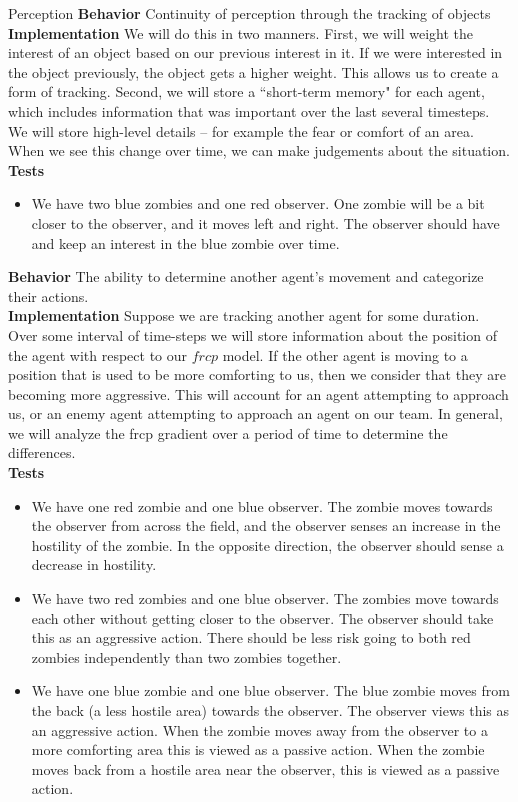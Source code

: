 \documentclass[11pt]{article}
\begin{document}
\begin{section}{Perception}
\textbf{Behavior} Continuity of perception through the tracking of objects\\

\textbf{Implementation} We will do this in two manners. First, we will weight the interest of an object based on our previous interest in it. If we were interested in the object previously, the object gets a higher weight. This allows us to create a form of tracking. Second, we will store a ``short-term memory" for each agent, which includes information that was important over the last several timesteps. We will store high-level details -- for example the fear or comfort of an area. When we see this change over time, we can make judgements about the situation. \\

\textbf{Tests}
\begin{itemize}
\item We have two blue zombies and one red observer. One zombie will be a bit closer to the observer, and it moves left and right. The observer should have and keep an interest in the blue zombie over time.
\end{itemize}

\textbf{Behavior} The ability to determine another agent's movement and categorize their actions. \\

\textbf{Implementation} Suppose we are tracking another agent for some duration. Over some interval of time-steps we will store information about the position of the agent with respect to our $frcp$ model. If the other agent is moving to a position that is used to be more comforting to us, then we consider that they are becoming more aggressive. This will account for an agent attempting to approach us, or an enemy agent attempting to approach an agent on our team. In general, we will analyze the frcp gradient over a period of time to determine the differences. \\

\textbf{Tests}\\ 
\begin{itemize}
\item We have one red zombie and one blue observer. The zombie moves towards the observer from across the field, and the observer senses an increase in the hostility of the zombie. In the opposite direction, the observer should sense a decrease in hostility.
\item We have two red zombies and one blue observer. The zombies move towards each other without getting closer to the observer. The observer should take this as an aggressive action. There should be less risk going to both red zombies independently than two zombies together.
\item We have one blue zombie and one blue observer. The blue zombie moves from the back (a less hostile area) towards the observer. The observer views this as an aggressive action. When the zombie moves away from the observer to a more comforting area this is viewed as a passive action. When the zombie moves back from a hostile area near the observer, this is viewed as a passive action.
\end{itemize}
\end{section}
\end{document}
